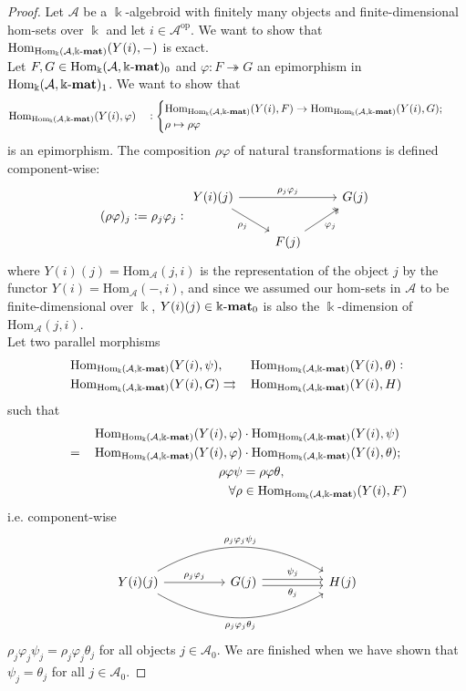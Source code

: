 \begin{proof}
Let $\mathcal{A}$ be a $\Bbbk$-algebroid with finitely many objects and finite-dimensional hom-sets over $\Bbbk$ and let
$i \in \mathcal{A}^{\text{op}}$.
We want to show that $\mathrm{Hom}_{\mathrm{Hom_{\Bbbk}}(\mathcal{A},\Bbbk\textnormal{-}\mathbf{mat})}(Y(i),-)$ is exact.\\
Let $F,G \in \mathrm{Hom_{\Bbbk}}(\mathcal{A},\Bbbk\textnormal{-}\mathbf{mat})_{0}$ and $\varphi : F \twoheadrightarrow G$ an epimorphism in $\mathrm{Hom_{\Bbbk}}(\mathcal{A},\Bbbk\textnormal{-}\mathbf{mat})_{1}$.
We want to show that
\begin{alignat}{2}
&\mathrm{Hom}_{\mathrm{Hom_{\Bbbk}}(\mathcal{A},\Bbbk\textnormal{-}\mathbf{mat})}(Y(i),\varphi) &&: \begin{cases}\mathrm{Hom}_{\mathrm{Hom_{\Bbbk}}(\mathcal{A},\Bbbk\textnormal{-}\mathbf{mat})}(Y(i), F) 
\rightarrow \mathrm{Hom}_{\mathrm{Hom_{\Bbbk}}(\mathcal{A},\Bbbk\textnormal{-}\mathbf{mat})}(Y(i), G); \\
\rho \mapsto \rho\varphi
\end{cases}
\end{alignat}
is an epimorphism.
The composition $\rho\varphi$ of natural transformations is defined component-wise:
\[
(\rho\varphi)_{j} := \rho_{j}\varphi_{j} : \begin{tikzcd}
Y(i)(j) \arrow[rd, "\rho_{j}"'] \arrow[rr, "\rho_{j}\varphi_{j}"] &                                            & G(j) \\
                                                                  & F(j) \arrow[ru, "\varphi_{j}"', two heads] &     
\end{tikzcd}
\]
where $Y(i)(j) = \mathrm{Hom}_{\mathcal{A}}(j,i)$ is the representation of the object $j$ by the functor
$Y(i) = \mathrm{Hom}_{\mathcal{A}}(-,i)$, and since we assumed our hom-sets in $\mathcal{A}$ to be finite-dimensional over $\Bbbk$,
$Y(i)(j) \in \Bbbk\textnormal{-}\mathbf{mat}_{0}$ is also the $\Bbbk$-dimension of $\mathrm{Hom}_{\mathcal{A}}(j,i)$.\\
Let two parallel morphisms 
\begin{alignat}{2}
&\mathrm{Hom}_{\mathrm{Hom_{\Bbbk}}(\mathcal{A},\Bbbk\textnormal{-}\mathbf{mat})}(Y(i),\psi),
&&\,\mathrm{Hom}_{\mathrm{Hom_{\Bbbk}}(\mathcal{A},\Bbbk\textnormal{-}\mathbf{mat})}(Y(i),\theta) : \\
&\mathrm{Hom}_{\mathrm{Hom_{\Bbbk}}(\mathcal{A},\Bbbk\textnormal{-}\mathbf{mat})}(Y(i),G)
\rightrightarrows &&\,\mathrm{Hom}_{\mathrm{Hom_{\Bbbk}}(\mathcal{A},\Bbbk\textnormal{-}\mathbf{mat})}(Y(i),H)
\end{alignat}
such that
\begin{alignat}{3}
& &\mathrm{Hom}_{\mathrm{Hom_{\Bbbk}}(\mathcal{A},\Bbbk\textnormal{-}\mathbf{mat})}(Y(i),\varphi) &\cdot \mathrm{Hom}_{\mathrm{Hom_{\Bbbk}}(\mathcal{A},\Bbbk\textnormal{-}\mathbf{mat})}(Y(i),\psi) \\
&= \,&\mathrm{Hom}_{\mathrm{Hom_{\Bbbk}}(\mathcal{A},\Bbbk\textnormal{-}\mathbf{mat})}(Y(i),\varphi) &\cdot \mathrm{Hom}_{\mathrm{Hom_{\Bbbk}}(\mathcal{A},\Bbbk\textnormal{-}\mathbf{mat})}(Y(i),\theta); \\
& &\rho\varphi\psi &= \rho\varphi\theta, \\
& &\forall \rho &\in \mathrm{Hom}_{\mathrm{Hom_{\Bbbk}}(\mathcal{A},\Bbbk\textnormal{-}\mathbf{mat})}(Y(i), F)
\end{alignat}
i.e. component-wise
\[
\begin{tikzcd}
Y(i)(j) \arrow[rr, "\rho_{j}\varphi_{j}"] \arrow[rrrr, "\rho_{j}\varphi_{j}\theta_{j}"', bend right] \arrow[rrrr, "\rho_{j}\varphi_{j}\psi_{j}", bend left] &  & G(j) \arrow[rr, "\psi_{j}", shift left] \arrow[rr, "\theta_{j}"', shift right] &  & H(j)
\end{tikzcd}
\]
$\rho_{j}\varphi_{j}\psi_{j} = \rho_{j}\varphi_{j}\theta_{j}$ for all objects $j \in \mathcal{A}_{0}$. We are finished when we have shown that
$\psi_{j} = \theta_{j}$ for all $j \in \mathcal{A}_{0}$.


\end{proof}
